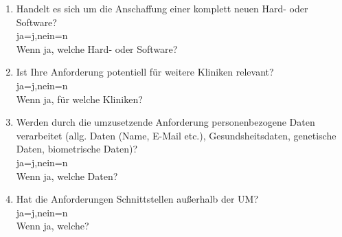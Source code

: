 \begin{Form}
\begin{enumerate}
	\item Handelt es sich um die Anschaffung einer komplett neuen Hard- oder Software? \\ 
	\ChoiceMenu[radio, radiosymbol=6 default=n, width=0.5cm, name=soha]{} {ja=j,nein=n} \\
	Wenn ja, welche Hard- oder Software? \\
	\TextField[multiline, name=jsoja,width=0.9\textwidth,  height=2cm, value={}]{}
	
	\item Ist Ihre Anforderung potentiell für weitere Kliniken relevant?
	 \\ \ChoiceMenu[radio, radiosymbol=6 default=n, width=0.5cm, name=user]{} {ja=j,nein=n} \\
	Wenn ja, für welche Kliniken? \\
	\TextField[multiline, name=juser,width=0.9\textwidth,  height=2cm, value={}]{}
	
	\item Werden durch die umzusetzende Anforderung personenbezogene Daten verarbeitet (allg. Daten (Name, E-Mail etc.), Gesundsheitsdaten, genetische Daten, biometrische Daten)? \\ 
	\ChoiceMenu[radio, radiosymbol=6 default=n, width=0.5cm, name=persodata]{} {ja=j,nein=n} \\
	Wenn ja, welche Daten? \\
	\TextField[multiline, name=jpersodata,width=0.9\textwidth,  height=2cm, value={}]{}
	\newpage
	\item Hat die Anforderungen Schnittstellen außerhalb der UM? \\ 
	\ChoiceMenu[radio, radiosymbol=6 default=n, width=0.5cm, name=outum]{} {ja=j,nein=n} \\
	Wenn ja, welche? \\
	\TextField[multiline, name=joutum,width=0.9\textwidth,  height=2cm, value={}]{}

  \end{enumerate}
\end{Form}